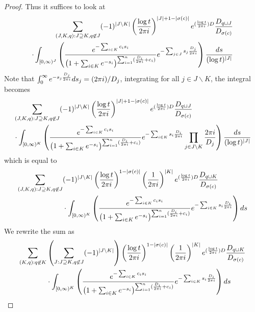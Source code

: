 \documentclass[10pt,a4paper]{amsart}
\begin{document}
\begin{proof}
Thus it suffices to look at 
\begin{align*}
	\sum_{(J,K,q):J\supseteq K,q\not\in J}(-1)^{|J\backslash K|}\left(\frac{\log t}{2\pi{\rm i}}\right)^{|J|+1-|\sigma(c)|}e^{(\frac{\log t}{2\pi {\rm i}}) D}\frac{D_{q\sqcup J}}{D_{\sigma(c)}}\\
	\cdot\int_{[0,\infty)^J}\left(\frac{e^{-\sum_{i\in K}c_is_i}}{\left(1+\sum_{i\in K}e^{-s_i}\right)^{\sum_{i=1}^n(\frac{D_i}{2\pi{\rm i}}+c_i)}}e^{-\sum_{j\in J}s_j \frac{D_j}{2\pi{\rm i}}}\right)\frac{ds}{(\log t)^{|J|}}
\end{align*}
Note that $\int_{0}^{\infty}e^{-s_j \frac{D_j}{2\pi{\rm i}}}ds_j=(2\pi{\rm i})/D_j$, integrating for all $j\in J\backslash K$, the integral becomes
\begin{align*}
	&\sum_{(J,K,q):J\supseteq K,q\not\in J}(-1)^{|J\backslash K|}\left(\frac{\log t}{2\pi{\rm i}}\right)^{|J|+1-|\sigma(c)|}e^{(\frac{\log t}{2\pi {\rm i}}) D}\frac{D_{q\sqcup J}}{D_{\sigma(c)}}\\
	&\cdot\int_{[0,\infty)^K}\left(\frac{e^{-\sum_{i\in K}c_is_i}}{\left(1+\sum_{i\in K}e^{-s_i}\right)^{\sum_{i=1}^n(\frac{D_i}{2\pi{\rm i}}+c_i)}}e^{-\sum_{i\in K}s_i \frac{D_i}{2\pi{\rm i}}}\prod_{j\in J\backslash K}\frac{2\pi {\rm i}}{D_j}\right)\frac{ds}{(\log t)^{|J|}}
\end{align*}
which is equal to
\begin{align*}
	\sum_{(J,K,q):J\supseteq K,q\not\in J}&(-1)^{|J\backslash K|}\left(\frac{\log t}{2\pi{\rm i}}\right)^{1-|\sigma(c)|}\left(\frac{1}{2\pi {\rm i}}\right)^{|K|}e^{(\frac{\log t}{2\pi {\rm i}}) D}\frac{D_{q\sqcup K}}{D_{\sigma(c)}}\\
	&\cdot\int_{[0,\infty)^K}\left(\frac{e^{-\sum_{i\in K}c_is_i}}{\left(1+\sum_{i\in K}e^{-s_i}\right)^{\sum_{i=1}^n(\frac{D_i}{2\pi{\rm i}}+c_i)}}e^{-\sum_{i\in K}s_i \frac{D_i}{2\pi{\rm i}}}\right)ds
\end{align*}
We rewrite the sum as
\begin{align*}
	\sum_{(K,q):q\not\in K}&\left(\sum_{J:J\supseteq K,q\not\in J}(-1)^{|J\backslash K|}\right)\left(\frac{\log t}{2\pi{\rm i}}\right)^{1-|\sigma(c)|}\left(\frac{1}{2\pi {\rm i}}\right)^{|K|}e^{(\frac{\log t}{2\pi {\rm i}}) D}\frac{D_{q\sqcup K}}{D_{\sigma(c)}}\\
	&\cdot\int_{[0,\infty)^K}\left(\frac{e^{-\sum_{i\in K}c_is_i}}{\left(1+\sum_{i\in K}e^{-s_i}\right)^{\sum_{i=1}^n(\frac{D_i}{2\pi{\rm i}}+c_i)}}e^{-\sum_{i\in K}s_i \frac{D_i}{2\pi{\rm i}}}\right)ds
\end{align*}


\end{proof}
\end{document}
